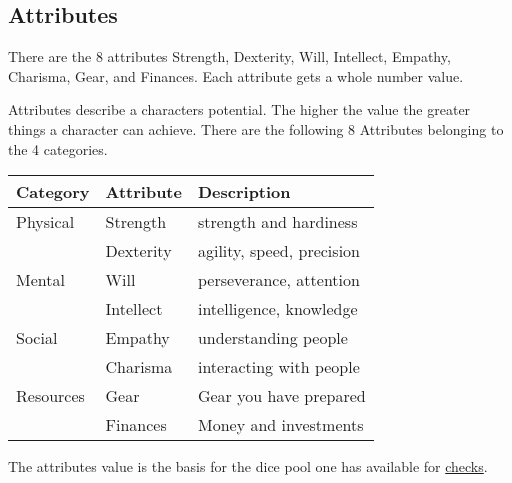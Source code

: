 \documentclass[11pt]{article}
\begin{document}
{\subsection{Attributes}
\label{sec:orgb22a034}
\begin{short}
There are the 8 attributes Strength, Dexterity, Will, Intellect, Empathy, Charisma, Gear, and Finances. Each attribute gets a whole number value.
\end{short}

Attributes describe a characters potential. The higher the value the greater things a character can achieve. There are the following 8 Attributes belonging to the 4 categories.

\begin{center}
\begin{tabular}{lll}
\textbf{Category} & \textbf{Attribute} & \textbf{Description}\\[0pt]
\hline
Physical & Strength & strength and hardiness\\[0pt]
 & Dexterity & agility, speed, precision\\[0pt]
\hline
Mental & Will & perseverance, attention\\[0pt]
 & Intellect & intelligence, knowledge\\[0pt]
\hline
Social & Empathy & understanding people\\[0pt]
 & Charisma & interacting with people\\[0pt]
\hline
Resources & Gear & Gear you have prepared\\[0pt]
 & Finances & Money and investments\\[0pt]
\end{tabular}
\end{center}

The attributes value is the basis for the dice pool one has available for \hyperref[sec:org12da81f]{checks}. 

}
\end{document}
